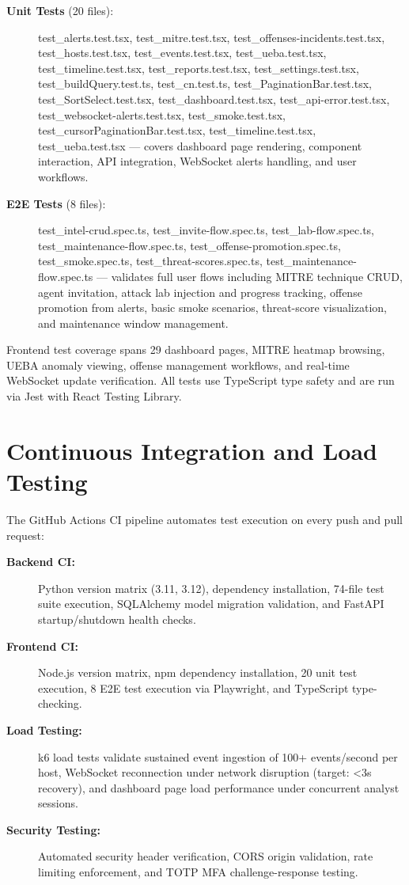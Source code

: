 \begin{description}
    \item[\textbf{Unit Tests} (20 files):] test\_alerts.test.tsx, test\_mitre.test.tsx, test\_offenses-incidents.test.tsx, test\_hosts.test.tsx, test\_events.test.tsx, test\_ueba.test.tsx, test\_timeline.test.tsx, test\_reports.test.tsx, test\_settings.test.tsx, test\_buildQuery.test.ts, test\_cn.test.ts, test\_PaginationBar.test.tsx, test\_SortSelect.test.tsx, test\_dashboard.test.tsx, test\_api-error.test.tsx, test\_websocket-alerts.test.tsx, test\_smoke.test.tsx, test\_cursorPaginationBar.test.tsx, test\_timeline.test.tsx, test\_ueba.test.tsx — covers dashboard page rendering, component interaction, API integration, WebSocket alerts handling, and user workflows.
    \item[\textbf{E2E Tests} (8 files):] test\_intel-crud.spec.ts, test\_invite-flow.spec.ts, test\_lab-flow.spec.ts, test\_maintenance-flow.spec.ts, test\_offense-promotion.spec.ts, test\_smoke.spec.ts, test\_threat-scores.spec.ts, test\_maintenance-flow.spec.ts — validates full user flows including MITRE technique CRUD, agent invitation, attack lab injection and progress tracking, offense promotion from alerts, basic smoke scenarios, threat-score visualization, and maintenance window management.
\end{description}

Frontend test coverage spans 29 dashboard pages, MITRE heatmap browsing, UEBA anomaly viewing, offense management workflows, and real-time WebSocket update verification. All tests use TypeScript type safety and are run via Jest with React Testing Library.

\section{Continuous Integration and Load Testing}
The GitHub Actions CI pipeline automates test execution on every push and pull request:

\begin{description}
    \item[\textbf{Backend CI:}] Python version matrix (3.11, 3.12), dependency installation, 74-file test suite execution, SQLAlchemy model migration validation, and FastAPI startup/shutdown health checks.
    \item[\textbf{Frontend CI:}] Node.js version matrix, npm dependency installation, 20 unit test execution, 8 E2E test execution via Playwright, and TypeScript type-checking.
    \item[\textbf{Load Testing:}] k6 load tests validate sustained event ingestion of 100+ events/second per host, WebSocket reconnection under network disruption (target: <3s recovery), and dashboard page load performance under concurrent analyst sessions.
    \item[\textbf{Security Testing:}] Automated security header verification, CORS origin validation, rate limiting enforcement, and TOTP MFA challenge-response testing.
\end{description}

